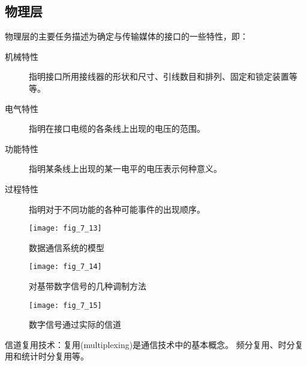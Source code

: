 \subsection{物理层}
物理层的主要任务描述为确定与传输媒体的接口的一些特性，即：


\begin{description}
  \item[机械特性] 指明接口所用接线器的形状和尺寸、引线数目和排列、固定和锁定装置等等。
  \item[电气特性] 指明在接口电缆的各条线上出现的电压的范围。

  \item[功能特性] 指明某条线上出现的某一电平的电压表示何种意义。
  \item[过程特性] 指明对于不同功能的各种可能事件的出现顺序。
\end{description}


\begin{figure}
  \centering
  \texttt{[image: fig\_7\_13]}\\
  \caption{数据通信系统的模型}\label{fig_7_13}
\end{figure}


\begin{figure}
  \centering
  \texttt{[image: fig\_7\_14]}\\
  \caption{对基带数字信号的几种调制方法 }\label{fig_7_14}
\end{figure}



\begin{figure}
  \centering
  \texttt{[image: fig\_7\_15]}\\
  \caption{数字信号通过实际的信道 }\label{fig_7_15}
\end{figure}



信道复用技术：复用(multiplexing)是通信技术中的基本概念。
频分复用、时分复用和统计时分复用等。

